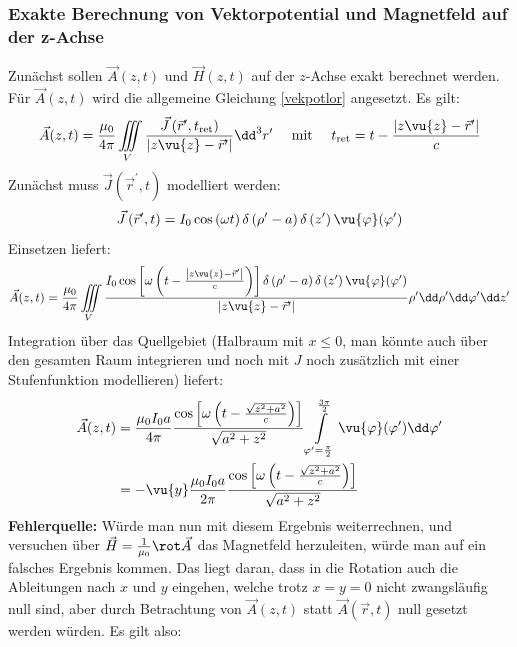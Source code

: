 		\subsubsection{Exakte Berechnung von Vektorpotential und Magnetfeld auf der z-Achse}
	Zunächst sollen $\vec{{A}}(z,t)$ und $\vec{H}(z,t)$ auf der $z$-Achse exakt berechnet werden. Für $\vec{A}(z,t)$ wird die allgemeine Gleichung \ref{vekpotlor} angesetzt. Es gilt:
	\begin{equation}
		\vec{{A}}(z, {t})=\frac{\mu_{0}}{4 \pi} \iiint\limits_V \frac{\vec{{J}}\left(\vec{{r}}^{\prime}, {t}_{\text{ret}}\right)}{\left|z\vu{z}-\vec{{r}}^{\prime}\right|} \dd^3 {r}^{\prime} \quad \text{ mit } \quad t_{\text{ret}}={t}-\frac{\left|z\vu{z}-\vec{{r}}^{\prime}\right|}{{c}}
	\end{equation}
	Zunächst muss $\vec{{J}}\left(\vec{{r}}^{\prime}, {t}\right)$ modelliert werden:
	\begin{equation}
		\vec{{J}}\left(\vec{{r}}^{\prime}, {t}\right)=I_{0} \cos\left(\omega t\right)\delta\left(\rho'-a \right) \delta\left(z' \right)\vu{\varphi} (\varphi')
	\end{equation}
	Einsetzen liefert:
	\begin{equation}
		\vec{{A}}(z, {t})=\frac{\mu_{0}}{4 \pi} \iiint\limits_V \frac{I_{0} \cos\left[\omega\left( {t}-\frac{\left|z\vu{z}-\vec{{r}}^{\prime}\right|}{{c}}\right)\right]\delta\left(\rho'-a \right) \delta\left(z' \right)\vu{\varphi}(\varphi') }{\left|z\vu{z}-\vec{{r}}^{\prime}\right|} \rho'\dd\rho'\dd\varphi'\dd z' 
	\end{equation}
	Integration über das Quellgebiet (Halbraum mit $x\leq0$, man könnte auch über den gesamten Raum integrieren und noch mit $J$ noch zusätzlich mit einer Stufenfunktion modellieren) liefert:
	\begin{equation}\begin{split}
			\vec{{A}}(z, {t})&=\frac{\mu_{0}I_{0} a}{4 \pi} \frac{\cos\left[\omega \left({t}-\frac{\sqrt{z^2+a^2}}{{c}}\right)\right] }{\sqrt{a^2+z^2}}\int\limits_{\varphi'=\frac{\pi}{2}}^{\frac{3\pi}{2}} \vu{\varphi}(\varphi')\dd \varphi'\\
			&=-\vu{y}\frac{\mu_{0}I_{0} a}{2 \pi} \frac{\cos\left[\omega \left({t}-\frac{\sqrt{z^2+a^2}}{{c}}\right)\right] }{\sqrt{a^2+z^2}}
	\end{split}\end{equation}
\textbf{Fehlerquelle:} Würde man nun mit diesem Ergebnis weiterrechnen, und versuchen über $\vec{H}=\frac{1}{\mu_0}\rot\vec{A}$ das Magnetfeld herzuleiten, würde man auf ein falsches Ergebnis kommen. Das liegt daran, dass in die Rotation auch die Ableitungen nach $x$ und $y$ eingehen, welche trotz $x=y=0$ nicht zwangsläufig null sind, aber durch Betrachtung von $\vec{{A}}(z, {t})$ statt $\vec{{A}}(\vec{r}, {t})$ null gesetzt werden würden. Es gilt also:
